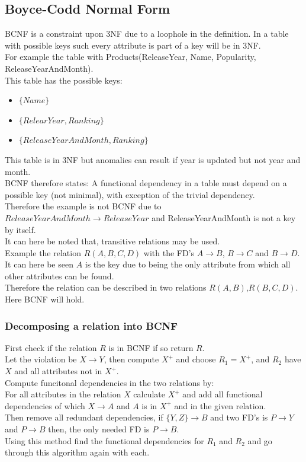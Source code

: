 \documentclass[12pt, a4paper]{article}
\begin{document}
		\subsection{Boyce-Codd Normal Form}
			BCNF is a constraint upon 3NF due to a loophole in the definition. In a table with possible keys such every attribute is part of a key will be in 3NF. \\
			For example the table with Products(ReleaseYear, Name, Popularity, ReleaseYearAndMonth).\\
			This table has the possible keys:
			\begin{itemize}
				\item $\{Name\}$
				\item $\{RelearYear, Ranking\}$
				\item $\{ReleaseYearAndMonth, Ranking\}$
			\end{itemize}
			This table is in 3NF but anomalies can result if year is updated but not year and month.\\[4mm]
			BCNF therefore states: A functional dependency in a table must depend on a possible key (not minimal), with exception of the trivial dependency.\\
			Therefore the example is not BCNF due to $ReleaseYearAndMonth \rightarrow ReleaseYear$ and ReleaseYearAndMonth is not a key by itself. \\[4mm]
			It can here be noted that, transitive relations may be used.\\
			Example the relation $R(A,B,C,D)$ with the FD's $A\rightarrow B$, $B\rightarrow C$ and $B\rightarrow D$.\\
			It can here be seen $A$ is the key due to being the only attribute from which all other attributes can be found.\\
			Therefore the relation can be described in two relations $R(A,B)$,$R(B,C,D)$. Here BCNF will hold.\\
			\subsubsection{Decomposing a relation into BCNF}
				First check if the relation $R$ is in BCNF if so return $R$.\\[4mm]
				Let the violation be $X\rightarrow Y$, then compute $X^+$ and choose $R_1=X^+$, and $R_2$ have $X$ and all attributes not in $X^+$.\\[4mm]
				Compute funcitonal dependencies in the two relations by:\\
				For all attributes in the relation $X$ calculate $X^+$  and add all functional dependencies of which $X\rightarrow A$ and $A$ is in $X^+$ and in the given relation.\\
				Then remove all redundant dependencies, if $\{Y,Z\}\rightarrow B$ and two FD's is $P\rightarrow Y$ and $P\rightarrow B$ then, the only needed FD is $P\rightarrow B$.\\
				Using this method find the functional dependencies for $R_1$ and $R_2$ and go through this algorithm again with each.
\end{document}
